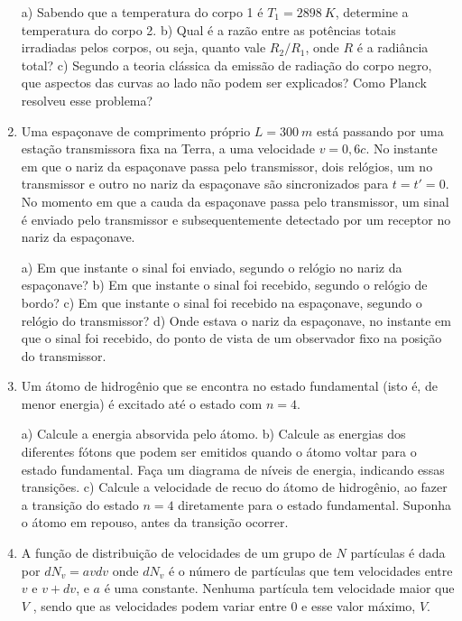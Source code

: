 \begin{enumerate}[start=1,label={\bfseries Q\arabic*.}]
a) Sabendo que a temperatura do corpo 1 é $T_{1} = 2898 \ K$, determine a temperatura do corpo 2.
b) Qual é a razão entre as potências totais irradiadas pelos corpos, ou seja, quanto vale $R_{2}/R_{1}$, onde $R$ é a radiância total?
c) Segundo a teoria clássica da emissão de radiação do corpo negro, que aspectos das curvas ao lado não podem ser explicados? Como Planck resolveu esse problema?





\item Uma espaçonave de comprimento próprio $L = 300 \ m$ está passando por uma estação transmissora fixa na Terra, a uma velocidade $v = 0,6c$. No instante em que o nariz da espaçonave passa pelo transmissor, dois relógios, um no transmissor e outro no nariz da espaçonave são sincronizados para $t = t' = 0$. No momento em que a cauda da espaçonave passa pelo transmissor, um sinal é enviado pelo transmissor e subsequentemente detectado por um receptor no nariz da espaçonave.

a) Em que instante o sinal foi enviado, segundo o relógio no nariz da espaçonave?
b) Em que instante o sinal foi recebido, segundo o relógio de bordo?
c) Em que instante o sinal foi recebido na espaçonave, segundo o relógio do transmissor?
d) Onde estava o nariz da espaçonave, no instante em que o sinal foi recebido, do ponto de vista de um observador fixo na posição do transmissor.





\item Um átomo de hidrogênio que se encontra no estado fundamental (isto é, de menor energia) é excitado até o estado com $n = 4$.

a) Calcule a energia absorvida pelo átomo.
b) Calcule as energias dos diferentes fótons que podem ser emitidos quando o átomo voltar para o estado fundamental. Faça um diagrama de níveis de energia, indicando essas transições.
c) Calcule a velocidade de recuo do átomo de hidrogênio, ao fazer a transição do estado $n = 4$ diretamente para o estado fundamental. Suponha o átomo em repouso, antes da transição ocorrer.


\item A função de distribuição de velocidades de um grupo de $N$ partículas é dada por $dN_{v} = av dv$ onde $dN_{v}$ é o número de partículas que tem velocidades entre $v$ e $v + dv$, e $a$ é uma constante. Nenhuma partícula tem velocidade maior que $V$ , sendo que as velocidades podem variar entre $0$ e esse valor máximo, $V$.


\end{enumerate}
